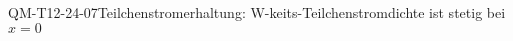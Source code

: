
\begin{CONC}{QM-T12-24-07}{Teilchenstromerhaltung: W-keits-Teilchenstromdichte ist stetig bei $x=0$}
\end{CONC}
